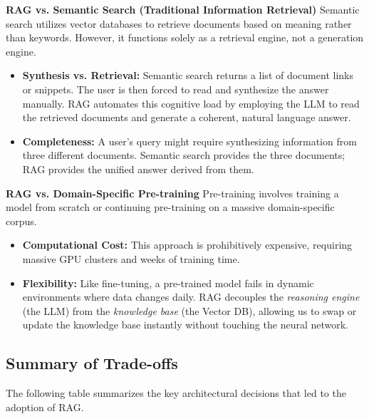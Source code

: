 \textbf{RAG vs. Semantic Search (Traditional Information Retrieval)}
Semantic search utilizes vector databases to retrieve documents based on meaning rather than keywords. However, it functions solely as a retrieval engine, not a generation engine.

\begin{itemize}
    \item \textbf{Synthesis vs. Retrieval:} Semantic search returns a list of document links or snippets. The user is then forced to read and synthesize the answer manually. RAG automates this cognitive load by employing the LLM to read the retrieved documents and generate a coherent, natural language answer.
    \item \textbf{Completeness:} A user's query might require synthesizing information from three different documents. Semantic search provides the three documents; RAG provides the unified answer derived from them.
\end{itemize}

\textbf{RAG vs. Domain-Specific Pre-training}
Pre-training involves training a model from scratch or continuing pre-training on a massive domain-specific corpus.

\begin{itemize}
    \item \textbf{Computational Cost:} This approach is prohibitively expensive, requiring massive GPU clusters and weeks of training time.
    \item \textbf{Flexibility:} Like fine-tuning, a pre-trained model fails in dynamic environments where data changes daily. RAG decouples the \textit{reasoning engine} (the LLM) from the \textit{knowledge base} (the Vector DB), allowing us to swap or update the knowledge base instantly without touching the neural network.
\end{itemize}

\subsection{Summary of Trade-offs}

The following table summarizes the key architectural decisions that led to the adoption of RAG.

